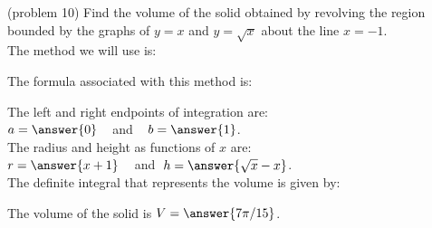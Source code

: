 \documentclass[handout]{ximera}
\begin{document}
\begin{problem}(problem 10)
Find the volume of the solid obtained by revolving the region bounded by the graphs of $y = x$ and $y = \sqrt x$ about the line $x = -1$.\\
The method we will use is:
\begin{multipleChoice}
\end{multipleChoice}

The formula associated with this method is:
\begin{multipleChoice}
\end{multipleChoice}

The left and right endpoints of integration are:\\
$a = \answer{0}\;\;\;$ and $\;\;\; b = \answer{1}$.\\
The radius and height as functions of $x$ are:\\
$r = \answer{x+1} \;\;\;$ and $\; h = \answer{\sqrt{x} - x}$.\\

The definite integral that represents the volume is given by:\\
\begin{multipleChoice}
\end{multipleChoice}

The volume of the solid is $V = \answer{7\pi/15}$.

\end{problem}
\end{document}
